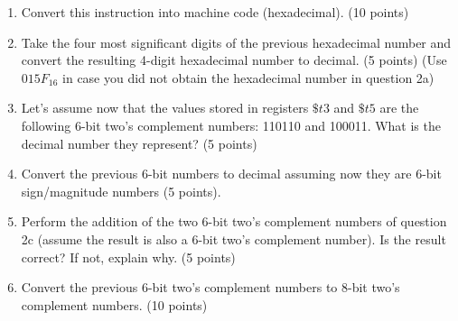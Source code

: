 \begin{enumerate}

\item Convert this instruction into machine code (hexadecimal). (10 points) %

\noindent{}

\item Take the four most significant digits of the previous hexadecimal number and convert the resulting 4-digit hexadecimal number to decimal. (5 points) 
(Use $015F_{16}$ in case you did not obtain the hexadecimal number in question 2a)

\noindent{}

\newpage
\item Let's assume now that the values stored in registers $\$t3$ and $\$t5$ are the following 6-bit two's complement numbers: 110110 and 100011. What is the decimal number they represent?  (5 points) 

\noindent{}


\item Convert the previous 6-bit numbers to decimal assuming now they are 6-bit sign/magnitude numbers (5 points). 

\noindent{}

\newpage
\item Perform the addition of the two 6-bit two's complement numbers of question 2c (assume the result is also a 6-bit two's complement number). Is the result correct? If not, explain why. (5 points) 

\noindent{}

\item Convert the previous 6-bit two's complement numbers to 8-bit two's complement numbers.  (10 points)

\noindent{}





\end{enumerate}


